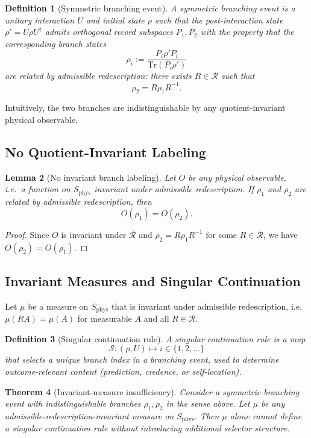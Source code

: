 \documentclass[11pt]{article}
\newtheorem{definition}{Definition}[section]
\newtheorem{lemma}[definition]{Lemma}
\newtheorem{theorem}[definition]{Theorem}
\theoremstyle{remark}
\theoremstyle{plain}
\begin{document}
\begin{definition}[Symmetric branching event]
A symmetric branching event is a unitary interaction $U$ and initial state $\rho$
such that the post-interaction state $\rho' = U\rho U^\dagger$
admits orthogonal record subspaces $P_1, P_2$ with the property that
the corresponding branch states
\[
\rho_i := \frac{P_i \rho' P_i}{\mathrm{Tr}(P_i \rho')}
\]
are related by admissible redescription:
there exists $R \in \mathcal{R}$ such that
\[
\rho_2 = R \rho_1 R^{-1}.
\]
\end{definition}

Intuitively, the two branches are indistinguishable by any
quotient-invariant physical observable.

\subsection{No Quotient-Invariant Labeling}

\begin{lemma}[No invariant branch labeling]
\label{lem:no-label}
Let $O$ be any physical observable, i.e.\ a function on $S_{\mathrm{phys}}$
invariant under admissible redescription.
If $\rho_1$ and $\rho_2$ are related by admissible redescription,
then
\[
O(\rho_1) = O(\rho_2).
\]
\end{lemma}

\begin{proof}
Since $O$ is invariant under $\mathcal{R}$ and
$\rho_2 = R\rho_1 R^{-1}$ for some $R\in\mathcal{R}$,
we have $O(\rho_2) = O(\rho_1)$.
\end{proof}

\subsection{Invariant Measures and Singular Continuation}

Let $\mu$ be a measure on $S_{\mathrm{phys}}$
that is invariant under admissible redescription,
i.e.\ $\mu(RA)=\mu(A)$ for measurable $A$ and all $R\in\mathcal{R}$.

\begin{definition}[Singular continuation rule]
A singular continuation rule is a map
\[
\mathcal{S} : (\rho,U) \mapsto i \in \{1,2,\dots\}
\]
that selects a unique branch index in a branching event,
used to determine outcome-relevant content
(prediction, credence, or self-location).
\end{definition}

\begin{theorem}[Invariant-measure insufficiency]
\label{thm:measure-insufficiency}
Consider a symmetric branching event with indistinguishable branches
$\rho_1,\rho_2$ in the sense above.
Let $\mu$ be any admissible-redescription-invariant measure on $S_{\mathrm{phys}}$.
Then $\mu$ alone cannot define a singular continuation rule
without introducing additional selector structure.
\end{theorem}
\end{document}
